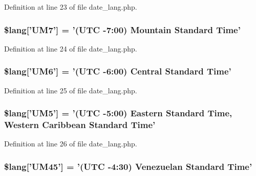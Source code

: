 Definition at line 23 of file date\-\_\-lang.\-php.

\hypertarget{date__lang_8php_aa642f12cf461f915682b17c0c30b2475}{
\subsubsection[{\$lang}]{\setlength{\rightskip}{0pt plus 5cm}\$lang\mbox{[}'U\-M7'\mbox{]} = '(U\-T\-C -\/7\-:00) Mountain Standard Time'}}\label{date__lang_8php_aa642f12cf461f915682b17c0c30b2475}


Definition at line 24 of file date\-\_\-lang.\-php.

\hypertarget{date__lang_8php_a30f39dd7748d488f4a0140751336d257}{
\subsubsection[{\$lang}]{\setlength{\rightskip}{0pt plus 5cm}\$lang\mbox{[}'U\-M6'\mbox{]} = '(U\-T\-C -\/6\-:00) Central Standard Time'}}\label{date__lang_8php_a30f39dd7748d488f4a0140751336d257}


Definition at line 25 of file date\-\_\-lang.\-php.

\hypertarget{date__lang_8php_a557150a51633e11dc49e3bfd2e1c091e}{
\subsubsection[{\$lang}]{\setlength{\rightskip}{0pt plus 5cm}\$lang\mbox{[}'U\-M5'\mbox{]} = '(U\-T\-C -\/5\-:00) Eastern Standard Time, Western Caribbean Standard Time'}}\label{date__lang_8php_a557150a51633e11dc49e3bfd2e1c091e}


Definition at line 26 of file date\-\_\-lang.\-php.

\hypertarget{date__lang_8php_aac9f8a1e0da4b3cee00a19fe9ac642d0}{
\subsubsection[{\$lang}]{\setlength{\rightskip}{0pt plus 5cm}\$lang\mbox{[}'U\-M45'\mbox{]} = '(U\-T\-C -\/4\-:30) Venezuelan Standard Time'}}\label{date__lang_8php_aac9f8a1e0da4b3cee00a19fe9ac642d0}


